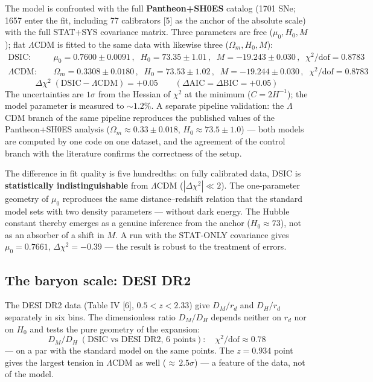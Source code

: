 \documentclass{article}
\begin{document}
The model is confronted with the full \textbf{Pantheon+SH0ES} catalog (1701 SNe; 1657 enter the fit, including 77 calibrators [5] as the anchor of the absolute scale) with the full STAT+SYS covariance matrix. Three parameters are free ($\mu_0, H_0, M$); flat $\Lambda$CDM is fitted to the same data with likewise three ($\Omega_m, H_0, M$):
\begin{align*}
\text{DSIC}: &\quad \mu_0 = 0.7600 \pm 0.0091\,, \;\; H_0 = 73.35 \pm 1.01\,, \;\; M = -19.243 \pm 0.030\,, \;\; \chi^2/\text{dof} = 0.8783 \\
\Lambda\text{CDM}: &\quad \Omega_m = 0.3308 \pm 0.0180\,, \;\; H_0 = 73.53 \pm 1.02\,, \;\; M = -19.244 \pm 0.030\,, \;\; \chi^2/\text{dof} = 0.8783
\end{align*}
\begin{equation*}
\Delta\chi^2\;(\text{DSIC} - \Lambda\text{CDM}) = +0.05 \qquad (\Delta\text{AIC} = \Delta\text{BIC} = +0.05)
\end{equation*}
The uncertainties are $1\sigma$ from the Hessian of $\chi^2$ at the minimum ($C = 2H^{-1}$); the model parameter is measured to ${\sim}1.2\%$. A separate pipeline validation: the $\Lambda$CDM branch of the same pipeline reproduces the published values of the Pantheon+SH0ES analysis ($\Omega_m \approx 0.33 \pm 0.018$, $H_0 \approx 73.5 \pm 1.0$) --- both models are computed by one code on one dataset, and the agreement of the control branch with the literature confirms the correctness of the setup.

The difference in fit quality is five hundredths: on fully calibrated data, DSIC is \textbf{statistically indistinguishable} from $\Lambda$CDM ($|\Delta\chi^2| \ll 2$). The one-parameter geometry of $\mu_0$ reproduces the same distance--redshift relation that the standard model sets with two density parameters --- without dark energy. The Hubble constant thereby emerges as a genuine inference from the anchor ($H_0 \approx 73$), not as an absorber of a shift in $M$. A run with the STAT-ONLY covariance gives $\mu_0 = 0.7661$, $\Delta\chi^2 = -0.39$ --- the result is robust to the treatment of errors.

\subsection{The baryon scale: DESI DR2}

The DESI DR2 data (Table IV [6], $0.5 < z < 2.33$) give $D_M/r_d$ and $D_H/r_d$ separately in six bins. The dimensionless ratio $D_M/D_H$ depends neither on $r_d$ nor on $H_0$ and tests the pure geometry of the expansion:
\begin{equation*}
D_M/D_H \;(\text{DSIC vs DESI DR2, 6 points}): \quad \chi^2/\text{dof} \approx 0.78
\end{equation*}
--- on a par with the standard model on the same points. The $z = 0.934$ point gives the largest tension in $\Lambda$CDM as well (${\approx}\,2.5\sigma$) --- a feature of the data, not of the model.
\end{document}
